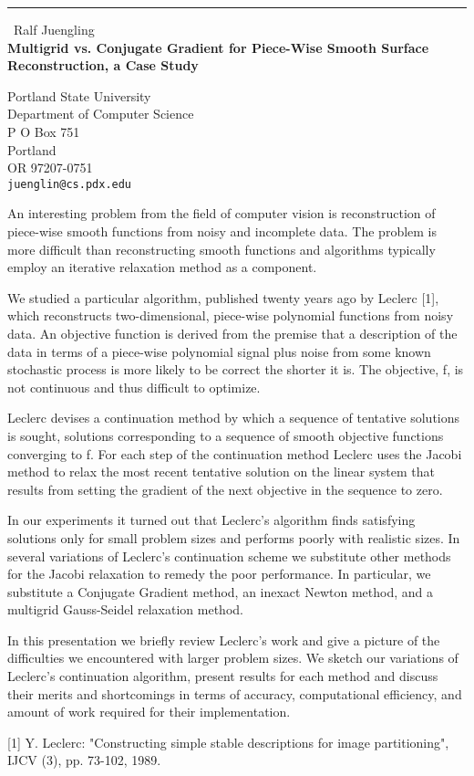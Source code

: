 \documentclass{report}
\begin{document}
\begin{center}
\rule{6in}{1pt} \
{\large Ralf Juengling \\
{\bf Multigrid vs. Conjugate Gradient for Piece-Wise Smooth Surface Reconstruction, a Case Study }}

Portland State University \\ Department of Computer Science \\ P O Box 751 \\ Portland \\ OR 97207-0751
\\
{\tt juenglin@cs.pdx.edu}\end{center}

An interesting problem from the field of computer vision
is reconstruction of piece-wise smooth functions from
noisy and incomplete data. The problem is more difficult
than reconstructing smooth functions and algorithms
typically employ an iterative relaxation method as a
component.

We studied a particular algorithm, published twenty years
ago by Leclerc [1], which reconstructs two-dimensional,
piece-wise polynomial functions from noisy data. An
objective function is derived from the premise that a
description of the data in terms of a piece-wise polynomial
signal plus noise from some known stochastic process is
more likely to be correct the shorter it is. The objective,
f, is not continuous and thus difficult to optimize.

Leclerc devises a continuation method by which a sequence
of tentative solutions is sought, solutions corresponding
to a sequence of smooth objective functions converging
to f. For each step of the continuation method Leclerc
uses the Jacobi method to relax the most recent tentative
solution on the linear system that results from setting
the gradient of the next objective in the sequence to zero.

In our experiments it turned out that Leclerc's algorithm
finds satisfying solutions only for small problem sizes
and performs poorly with realistic sizes. In several
variations of Leclerc's continuation scheme we substitute
other methods for the Jacobi relaxation to remedy the poor
performance. In particular, we substitute a Conjugate
Gradient method, an inexact Newton method, and a multigrid
Gauss-Seidel relaxation method.

In this presentation we briefly review Leclerc's work and
give a picture of the difficulties we encountered with
larger problem sizes. We sketch our variations of Leclerc's
continuation algorithm, present results for each method and
discuss their merits and shortcomings in terms of accuracy,
computational efficiency, and amount of work required
for their implementation.


[1] Y. Leclerc: "Constructing simple stable descriptions
for image partitioning", IJCV (3), pp. 73-102, 1989.
\end{document}
